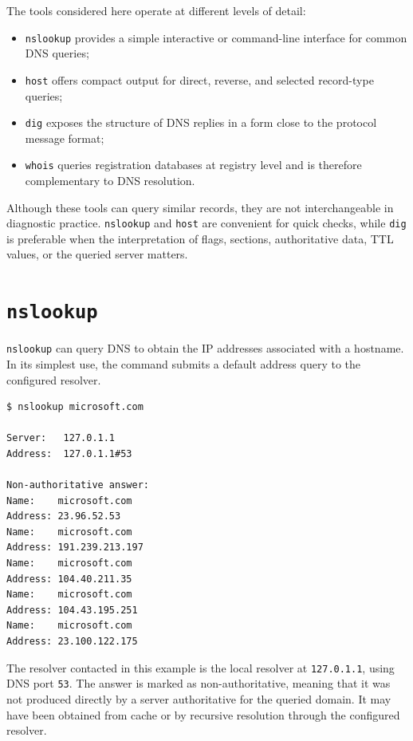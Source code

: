 \documentclass{scrbook}
\begin{document}
	The tools considered here operate at different levels of detail:
	\begin{itemize}
	    \item \texttt{nslookup} provides a simple interactive or command-line interface for common DNS queries;
	    \item \texttt{host} offers compact output for direct, reverse, and selected record-type queries;
	    \item \texttt{dig} exposes the structure of DNS replies in a form close to the protocol message format;
	    \item \texttt{whois} queries registration databases at registry level and is therefore complementary to DNS resolution.
	\end{itemize}
	
	Although these tools can query similar records, they are not interchangeable in diagnostic practice. \texttt{nslookup} and \texttt{host} are convenient for quick checks, while \texttt{dig} is preferable when the interpretation of flags, sections, authoritative data, TTL values, or the queried server matters.
	
	\section{\texttt{nslookup}}
	
	\texttt{nslookup} can query DNS to obtain the IP addresses associated with a hostname. In its simplest use, the command submits a default address query to the configured resolver.
	
	\begin{lstlisting}
$ nslookup microsoft.com

Server:   127.0.1.1
Address:  127.0.1.1#53

Non-authoritative answer:
Name:    microsoft.com
Address: 23.96.52.53
Name:    microsoft.com
Address: 191.239.213.197
Name:    microsoft.com
Address: 104.40.211.35
Name:    microsoft.com
Address: 104.43.195.251
Name:    microsoft.com
Address: 23.100.122.175
	\end{lstlisting}
	
	The resolver contacted in this example is the local resolver at \texttt{127.0.1.1}, using DNS port \texttt{53}. The answer is marked as non-authoritative, meaning that it was not produced directly by a server authoritative for the queried domain. It may have been obtained from cache or by recursive resolution through the configured resolver.\\
	
\end{document}
